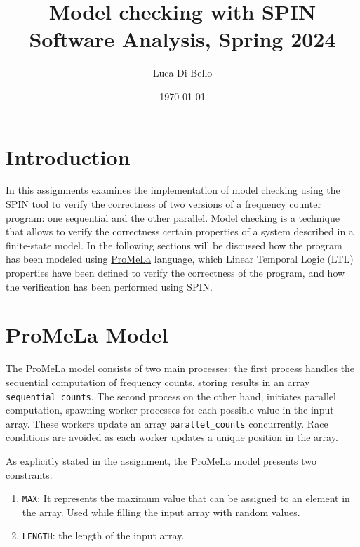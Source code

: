 \documentclass[a4paper, 11pt]{article}
\title{Model checking with SPIN \\[1ex] \large Software Analysis, Spring 2024}
\author{Luca Di Bello}
\date{\today}
\begin{document}
\maketitle
\tableofcontents

\section{Introduction}

In this assignments examines the implementation of model checking using the \href{https://spinroot.com/spin/whatispin.html}{SPIN} tool to verify the correctness of two versions of a frequency counter program: one sequential and the other parallel. Model checking is a technique that allows to verify the correctness certain properties of a system described in a finite-state model.
\vspace{1em}
\noindent In the following sections will be discussed how the program has been modeled using \href{https://en.wikipedia.org/wiki/Promela}{ProMeLa} language, which Linear Temporal Logic (LTL) properties have been defined to verify the correctness of the program, and how the verification has been performed using SPIN.

\pagebreak

\section{ProMeLa Model}

The ProMeLa model consists of two main processes: the first process handles the sequential computation of frequency counts, storing results in an array \texttt{sequential\_counts}. The second process on the other hand, initiates parallel computation, spawning worker processes for each possible value in the input array. These workers update an array \texttt{parallel\_counts} concurrently. Race conditions are avoided as each worker updates a unique position in the array.

As explicitly stated in the assignment, the ProMeLa model presents two constrants:

\begin{enumerate}
	\item \texttt{MAX}: It represents the maximum value that can be assigned to an element in the array. Used while filling the input array with random values.
	\item \texttt{LENGTH}: the length of the input array.
\end{enumerate}
\end{document}

